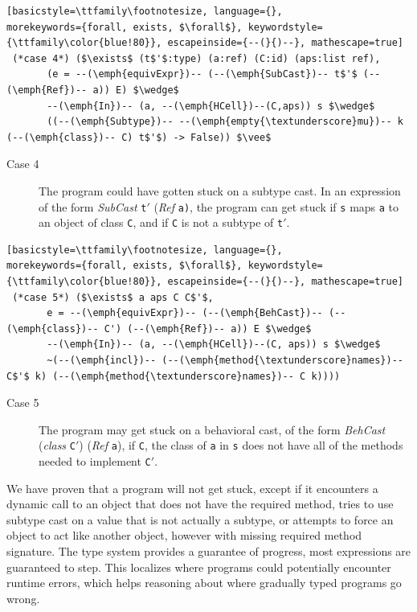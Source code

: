 \documentclass[a4paper,USenglish]{tex/lipics-v2016}
\begin{document}
\begin{lstlisting}[basicstyle=\ttfamily\footnotesize, language={}, 
morekeywords={forall, exists, $\forall$}, keywordstyle={\ttfamily\color{blue!80}}, escapeinside={--(}{)--}, mathescape=true]
 (*case 4*) ($\exists$ (t$'$:type) (a:ref) (C:id) (aps:list ref),
       (e = --(\emph{equivExpr})-- (--(\emph{SubCast})-- t$'$ (--(\emph{Ref})-- a)) E) $\wedge$
       --(\emph{In})-- (a, --(\emph{HCell})--(C,aps)) s $\wedge$
       ((--(\emph{Subtype})-- --(\emph{empty{\textunderscore}mu})-- k (--(\emph{class})-- C) t$'$) -> False)) $\vee$
\end{lstlisting}
\begin{description}
  \item[Case 4] The program could have gotten stuck on a subtype cast.  In
    an expression of the form \emph{SubCast} \texttt{t$'$} (\emph{Ref}
    \texttt{a)}, the program can get stuck if \verb|s| maps \verb|a| to an
    object of class \verb|C|, and if \verb|C| is not a subtype of
    \verb|t|$'$.
\end{description}

\begin{lstlisting}[basicstyle=\ttfamily\footnotesize, language={}, 
morekeywords={forall, exists, $\forall$}, keywordstyle={\ttfamily\color{blue!80}}, escapeinside={--(}{)--}, mathescape=true]
 (*case 5*) ($\exists$ a aps C C$'$, 
       e = --(\emph{equivExpr})-- (--(\emph{BehCast})-- (--(\emph{class})-- C') (--(\emph{Ref})-- a)) E $\wedge$
       --(\emph{In})-- (a, --(\emph{HCell})--(C, aps)) s $\wedge$
       ~(--(\emph{incl})-- (--(\emph{method{\textunderscore}names})-- C$'$ k) (--(\emph{method{\textunderscore}names})-- C k))))
\end{lstlisting}
\begin{description}
  \item[Case 5] The program may get stuck on a behavioral cast, of the form
    \emph{BehCast} (\emph{class} \texttt{C}$'$) (\emph{Ref} \texttt{a}), if
    \verb|C|, the class of \verb|a| in \verb|s| does not have all of the
    methods needed to implement \verb|C|$'$.
\end{description}

We have proven that a \kafka program will not get stuck, except if it
encounters a dynamic call to an object that does not have the required
method, tries to use subtype cast on a value that is not actually a subtype,
or attempts to force an object to act like another object, however with
missing required method signature.  The \kafka type system provides a
guarantee of progress, most expressions are guaranteed to step.  This
localizes where \kafka programs could potentially encounter runtime errors,
which helps reasoning about where gradually typed programs go wrong.
\end{document}

